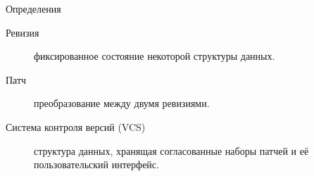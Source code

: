 \begin{frame}{Определения}
\begin{description}
\item[Ревизия] фиксированное состояние некоторой структуры данных.
\item[Патч] преобразование между двумя ревизиями.
\item[Система контроля версий (VCS)] структура данных, хранящая
  согласованные наборы патчей и её пользовательский интерфейс.
\end{description}
\end{frame}
